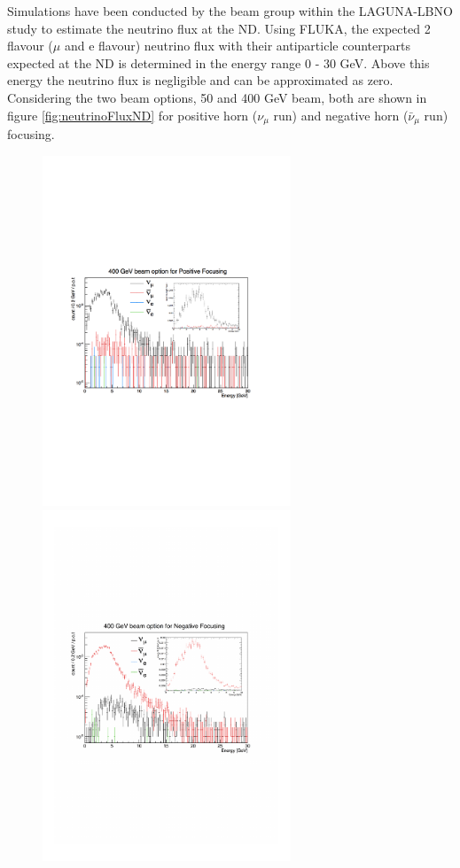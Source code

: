 Simulations have been conducted by the beam group within the LAGUNA-LBNO study to estimate the neutrino flux at the ND. Using FLUKA\cite{fluka}, the expected 2 flavour ($\mu$ and e flavour) neutrino flux with their antiparticle counterparts expected at the ND is determined in the energy range 0 - 30 GeV. Above this energy the neutrino flux is negligible and can be approximated as zero. Considering the two beam options, 50 and 400 GeV beam, both are shown in figure \ref{fig:neutrinoFluxND} for positive horn ($\nu_{\mu}$ run) and negative horn ($\bar{\nu}_{\mu}$ run) focusing. 
\begin{figure}[htbp]
	\begin{center}
		\includegraphics[width=74mm]{Chapter3/figures/400_PF_800m_2o5mRadius_allFlav_combined.pdf}
		\includegraphics[width=74mm]{Chapter3/figures/400_NF_800m_2o5mRadius_allFlav_combined.pdf}

\end{center}
\end{figure}
